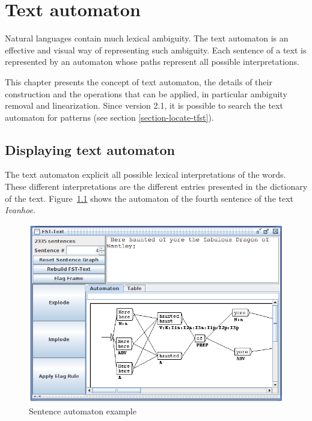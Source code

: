 \chapter{Text automaton}
\label{chap-text-automaton}
Natural languages contain much lexical ambiguity. The text automaton is an
effective and visual way of representing such ambiguity. Each sentence of a
text is represented by an automaton whose paths represent all possible
interpretations.

\bigskip
\noindent This chapter presents the concept of text automaton, the details of
their construction and the operations that can be applied, in particular ambiguity
removal and linearization. Since version 2.1, it is possible 
to search the text automaton for patterns (see section
\ref{section-locate-tfst}).


\section{Displaying text automaton} 
The text automaton explicit all possible lexical interpretations of the
words. These different interpretations are the different entries presented in
the dictionary of the text.
Figure~\ref{fig-sentence-automaton} shows the automaton of the fourth
sentence of the text \textit{Ivanhoe}.

\begin{figure}[!ht]
\begin{center}
\includegraphics[width=15.5cm]{resources/img/fig7-1.png}
\caption{Sentence automaton example\label{fig-sentence-automaton}}
\end{center}
\end{figure}

